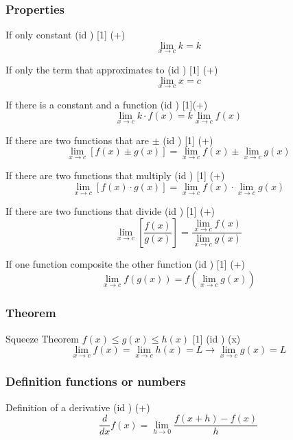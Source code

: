 \documentclass{book}
\begin{document}
                \subsubsection{Properties}
                    If only constant (id \LimitConstant) [1] (+)
                    \[\lim_{x \rightarrow c} k = k\]
    
                    If only the term that approximates to (id \LimitToHim) [1] (+)
                    \[\lim_{x \rightarrow c} x = c\]
    
                    If there is a constant and a function (id \LimitConstantFuntion) [1](+)
                    \[\lim_{x \rightarrow c} k \cdot f(x) = k \lim_{x \rightarrow c} f(x)\]
    
                    If there are two functions that are $\pm$ (id \LimitSummationFunctions) [1] (+)
                    \[\lim_{x \rightarrow c} [f(x) \pm g(x)] = \lim_{x \rightarrow c} f(x) \pm \lim_{x \rightarrow c} g(x)\]
    
                    If there are two functions that multiply (id \LimitFunctionsMultiply) [1] (+)
                    \[\lim_{x \rightarrow c} [f(x) \cdot g(x)] = \lim_{x \rightarrow c} f(x) \cdot \lim_{x \rightarrow c} g(x)\]
    
                    If there are two functions that divide (id \LimitDivideFunctions) [1] (+)
                    \[\lim_{x \rightarrow c} \left[\frac{f(x)}{g(x)}\right] = \frac{\lim_{x \rightarrow c} f(x)}{\lim_{x \rightarrow c} g(x)}\]
    
                    If one function composite the other function (id \LimitCompositeFunction) [1] (+)
                    \[\lim_{x \rightarrow c} f(g(x)) = f(\lim_{x \rightarrow c} g(x))\]                   

                \subsubsection{Theorem}
                    Squeeze Theorem $f(x) \leq g(x) \leq h(x)$ [1] (id \SqueezeTheorem) (x)
                    \[\lim_{x \rightarrow c} f(x) = \lim_{x \rightarrow c} h(x) = L \rightarrow \lim_{x \rightarrow c} g(x) = L\]

                \subsubsection{Definition functions or numbers}
                    Definition of a derivative (id \LimitDefinitionDerivative) (+)
                    \[\frac{d}{dx} f(x) = \lim_{h \rightarrow 0} \frac{f(x + h) - f(x)}{h}\]
\end{document}
